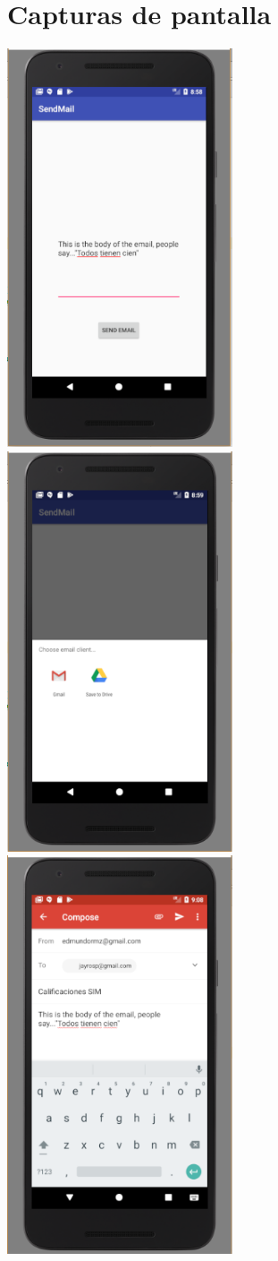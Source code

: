 \documentclass{report}
\begin{document}
\chapter{Capturas de pantalla}
\includegraphics[width=0.5\textwidth]{../images/mail_1.PNG}
\includegraphics[width=0.5\textwidth]{../images/mail_2.PNG}
\includegraphics[width=0.5\textwidth]{../images/mail_3.PNG}
\end{document}
